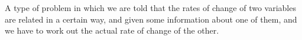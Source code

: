 A type of problem in which we are told that the rates of change of
two variables are related in a certain way, and given some information
about one of them, and we have to work out the actual rate of change of the other.